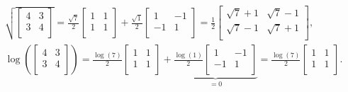 \documentclass[a4paper,12pt]{article}
\begin{document}
    \begin{gather}
        \nonumber
        \sqrt{
        \begin{bmatrix}
            4 & 3 \\
            3 & 4 \\
        \end{bmatrix}} = 
        \frac{\sqrt{7}}{2}
        \begin{bmatrix}
            1 & 1 \\
            1 & 1 \\
        \end{bmatrix}
        +
        \frac{\sqrt{1}}{2}
        \begin{bmatrix}
            1 & -1 \\
            -1 & 1 \\
        \end{bmatrix} =
        \frac{1}{2}
        \begin{bmatrix}
            \sqrt{7} + 1 & \sqrt{7} - 1 \\
            \sqrt{7} - 1 & \sqrt{7} + 1 \\
        \end{bmatrix} \textrm{,} \\
        \log \left(
        \begin{bmatrix}
            4 & 3 \\
            3 & 4 \\
        \end{bmatrix} \right) = 
        \frac{\log(7)}{2}
        \begin{bmatrix}
            1 & 1 \\
            1 & 1 \\
        \end{bmatrix}
        +
        \underbrace{\frac{\log(1)}{2}
        \begin{bmatrix}
            1 & -1 \\
            -1 & 1 \\
        \end{bmatrix}}_{=0} =
        \frac{\log(7)}{2}
        \begin{bmatrix}
            1 & 1 \\
            1 & 1 \\
        \end{bmatrix} \textrm{.}
    \end{gather}
\end{document}
